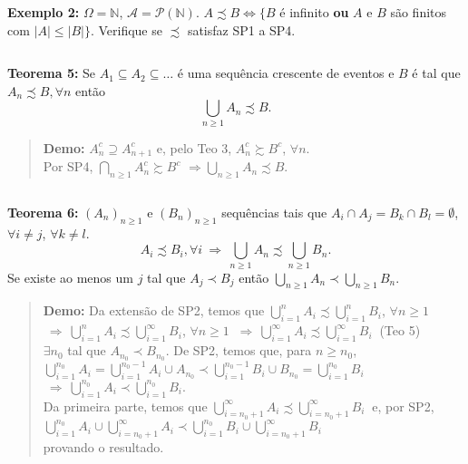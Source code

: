 \documentclass[
]{book}
\begin{document}
\(~\)

\textbf{Exemplo 2:} \(\Omega = \mathbb{N}\), \(\mathcal{A} = \mathcal{P}(\mathbb{N})\). \(A \precsim B \Leftrightarrow \{B\) é infinito \textbf{ou} \(A\) e \(B\) são finitos com \(|A| \leq |B|\}\). Verifique se \(\precsim\) satisfaz SP1 a SP4.

\(~\)

\textbf{Teorema 5:} Se \(A_1 \subseteq A_2 \subseteq \ldots\) é uma sequência crescente de eventos e \(B\) é tal que \(A_n \precsim B, \forall n\) então \[\bigcup_{n \geq 1} A_n \precsim B.\]

\begin{quote}
\textbf{Demo:} \(A_n^c \supseteq A_{n+1}^c\) e, pelo Teo 3, \(A_n^c \succsim B^c\), \(\forall n\).\\
Por SP4, \(\bigcap_{n \geq 1} A_n^c \succsim B^c\) \(\Rightarrow \bigcup_{n \geq 1} A_n \precsim B.\)
\end{quote}

\(~\)

\textbf{Teorema 6:} \(\left(A_n\right)_{n \geq 1}\) e \(\left(B_n\right)_{n \geq 1}\) sequências tais que \(A_i \cap A_j = B_k \cap B_l = \emptyset\), \(\forall i \neq j\), \(\forall k \neq l\).
\[A_i \precsim B_i, \forall i ~\Rightarrow~ \bigcup_{n \geq 1} A_n \precsim \bigcup_{n \geq 1} B_n.\]
Se existe ao menos um \(j\) tal que \(A_j \prec B_j\) então \(\displaystyle{ \bigcup_{n \geq 1} A_n \prec \bigcup_{n \geq 1} B_n }.\)

\begin{quote}
\textbf{Demo:} Da extensão de SP2, temos que \(\displaystyle{ \bigcup_{i = 1}^n A_i \precsim \bigcup_{i = 1}^n B_i }\), \(\forall n \geq 1\) \(~\Rightarrow~ \displaystyle{ \bigcup_{i = 1}^n A_i \precsim \bigcup_{i = 1}^{\infty} B_i }\), \(\forall n \geq 1\) \(~\Rightarrow~ \displaystyle{ \bigcup_{i = 1}^{\infty} A_i \precsim \bigcup_{i = 1}^{\infty} B_i }~\) (Teo 5)\\
\(\exists n_0\) tal que \(A_{n_0} \prec B_{n_0}\). De SP2, temos que, para \(n \geq n_0\),\\
\(\displaystyle \bigcup_{i = 1}^{n_0} A_i = \bigcup_{i = 1}^{n_0-1} A_i \cup A_{n_0} \prec \bigcup_{i = 1}^{n_0-1} B_i \cup B_{n_0} = \bigcup_{i = 1}^{n_0} B_i\) \(~\Rightarrow~ \displaystyle \bigcup_{i = 1}^{n_0} A_i \prec \bigcup_{i = 1}^{n_0} B_i.\)\\
Da primeira parte, temos que \(\displaystyle{ \bigcup_{i = n_0+1}^{\infty} A_i \precsim \bigcup_{i = n_0+1}^{\infty} B_i } ~\) e, por SP2,\\
\(\displaystyle \bigcup_{i = 1}^{n_0} A_i \cup \bigcup_{i = n_0+1}^{\infty} A_i \prec \bigcup_{i = 1}^{n_0} B_i \cup \bigcup_{i = n_0+1}^{\infty} B_i\)\\
provando o resultado.
\end{quote}
\end{document}
